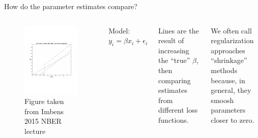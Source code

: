 \documentclass[mathserif, handout, aspectratio=169]{beamer}
\begin{document}
\begin{frame}{How do the parameter estimates compare?}
\begin{columns}
\begin{figure}
\includegraphics[scale=0.45]{lasso-ridge-subset-vs-ols}
\caption*{\tiny Figure taken from Imbens 2015 NBER lecture}
\end{figure}

Model: $	y_i = \beta x_i + \epsilon_i$

\vspace{5mm}

Lines are the result of increasing the ``true'' $\beta$, then comparing estimates from different loss functions.

\vspace{5mm}

We often call regularization approaches ``shrinkage'' methods because, in general, they smoosh parameters closer to zero.
\end{columns}

\end{frame}
\end{document}
